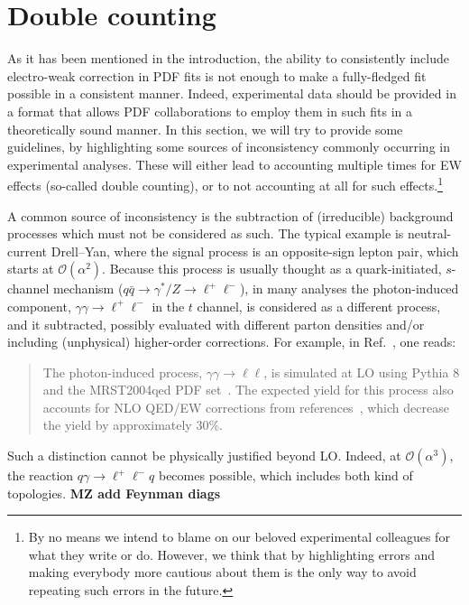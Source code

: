 \section{Double counting}
\label{sec:doublecounting}

As it has been mentioned in the introduction, the ability to consistently include electro-weak correction in
PDF fits is not enough to make a fully-fledged fit possible in a consistent manner. Indeed, experimental data should
be provided in  a format that allows PDF collaborations to employ them in such fits in a theoretically sound manner. In this
section, we will try to provide some guidelines, by highlighting some sources of inconsistency commonly occurring in experimental 
analyses. These will either lead to accounting multiple times for EW effects (so-called double counting), or to not accounting at
all for such effects.\footnote{By no means we intend to blame on our beloved experimental colleagues for what they write or do. However,
    we think that by highlighting errors and making everybody more cautious about them is the only way to avoid repeating such
    errors in the future.}

A common source of inconsistency is the subtraction of (irreducible) background processes which must not be considered as such. The typical example
is neutral-current Drell--Yan, where the signal process is an opposite-sign lepton pair, which starts
at $\mathcal O(\alpha^2)$. Because this process is usually thought
as a quark-initiated, $s$-channel mechanism ($q\bar q \to \gamma^*/Z \to \ell^+ \ell^-$), in many analyses the photon-induced component,
$\gamma \gamma \to \ell^+ \ell^-$ in the $t$ channel, is considered as a different process, and it 
subtracted, possibly evaluated with different parton densities and/or including (unphysical) higher-order 
corrections. For example, in Ref.~\cite{Aaboud:2017ffb}, one reads:
\begin{quote}
The photon-induced process, $\gamma\gamma \to \ell \ell$, is simulated at LO using Pythia 8 
and the MRST2004qed PDF set~\cite{Martin:2004dh}. The expected yield for this process also accounts for 
NLO QED/EW corrections from references~\cite{Bardin:2012jk,Bondarenko:2013nu}, which decrease the yield by approximately 30\%.
\end{quote}
Such a distinction cannot be physically
justified beyond LO\@. Indeed, at $\mathcal O(\alpha^3)$, the reaction $q \gamma \to \ell^+ \ell^- q$ becomes possible, which
includes both kind of topologies. {\bf MZ add Feynman diags}

